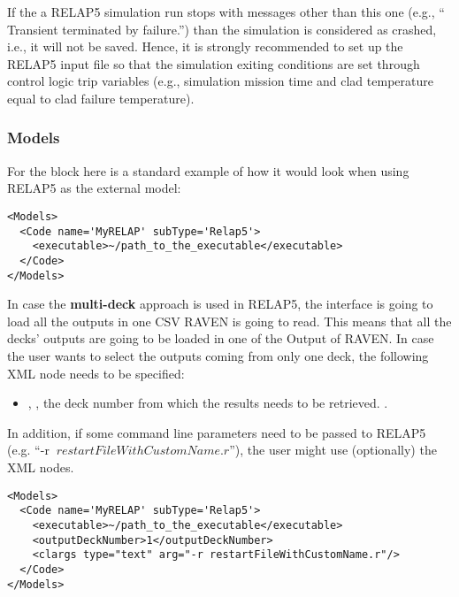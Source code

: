 If the a RELAP5 simulation run stops with messages other than this one (e.g., `` Transient terminated by failure.'') than the simulation is considered as
crashed, i.e., it will not be saved.
Hence, it is strongly recommended to set up the RELAP5 input file so that the simulation exiting conditions are set through control logic trip variables
(e.g., simulation mission time and clad temperature equal to clad failure temperature).

\subsubsection{Models}
\label{subsubsection:Relap5Models}
For the  block here is a standard example of how it would look
when using RELAP5 as the external model:
\begin{lstlisting}[style=XML]
<Models>
  <Code name='MyRELAP' subType='Relap5'>
    <executable>~/path_to_the_executable</executable>
  </Code>
</Models>
\end{lstlisting}
In case the \textbf{multi-deck} approach is used in RELAP5, the interface is going to load all the outputs in one CSV RAVEN is
going to read. This means that all the decks' outputs are going to be loaded in one of the Output of RAVEN. In case the user
wants to select the outputs coming from only one deck, the following XML node needs to be specified:
\begin{itemize}
   \item {}, , the deck number from
   which the results needs to be retrieved. .
\end{itemize}
In addition, if some command line parameters need to be passed to RELAP5 \\(e.g. ``-r
$\: restartFileWithCustomName.r$''), the user might use (optionally) the  XML nodes.
\begin{lstlisting}[style=XML]
<Models>
  <Code name='MyRELAP' subType='Relap5'>
    <executable>~/path_to_the_executable</executable>
    <outputDeckNumber>1</outputDeckNumber>
    <clargs type="text" arg="-r restartFileWithCustomName.r"/>
  </Code>
</Models>
\end{lstlisting}


